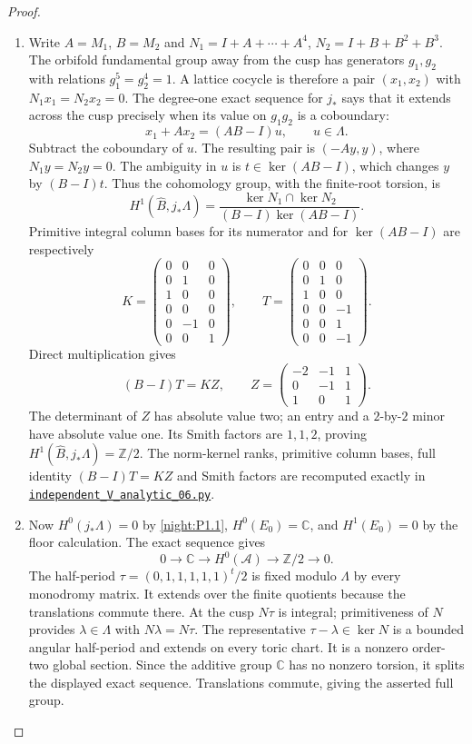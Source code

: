 \begin{proof}
\begin{enumerate}[label={$\langle1\rangle$\arabic*.}]
\item Write $A=M_1$, $B=M_2$ and
$N_1=I+A+\cdots+A^4$, $N_2=I+B+B^2+B^3$.
The orbifold fundamental group away from the cusp has generators
$g_1,g_2$ with relations $g_1^5=g_2^4=1$.  A lattice cocycle is
therefore a pair $(x_1,x_2)$ with $N_1x_1=N_2x_2=0$.
The degree-one exact sequence for $j_*$ says that it extends across
the cusp precisely when its value on $g_1g_2$ is a coboundary:
\[
x_1+Ax_2=(AB-I)u,\qquad u\in\Lambda.
\]
Subtract the coboundary of $u$.  The resulting pair is $(-Ay,y)$,
where $N_1y=N_2y=0$.  The ambiguity in $u$ is
$t\in\ker(AB-I)$, which changes $y$ by $(B-I)t$.
Thus the cohomology group, with the finite-root torsion, is
\[
H^1(\widehat B,j_*\Lambda)=
\frac{\ker N_1\cap\ker N_2}{(B-I)\ker(AB-I)}.
\]
Primitive integral column bases for its numerator and for
$\ker(AB-I)$ are respectively
\[
K=\begin{pmatrix}
0&0&0\\0&1&0\\1&0&0\\0&0&0\\0&-1&0\\0&0&1
\end{pmatrix},\qquad
T=\begin{pmatrix}
0&0&0\\0&1&0\\1&0&0\\0&0&-1\\0&0&1\\0&0&-1
\end{pmatrix}.
\]
Direct multiplication gives
\[
(B-I)T=KZ,\qquad
Z=\begin{pmatrix}-2&-1&1\\0&-1&1\\1&0&1\end{pmatrix}.
\]
The determinant of $Z$ has absolute value two; an entry and a
$2$-by-$2$ minor have absolute value one.  Its Smith factors are
$1,1,2$, proving $H^1(\widehat B,j_*\Lambda)=\mathbb Z/2$.
The norm-kernel ranks, primitive column bases, full identity
$(B-I)T=KZ$ and Smith factors are recomputed exactly in
\href{https://github.com/KokunoYumeto/s6-complex-structure-workbench/blob/83d76022bcd442278b760db9ff438afceed6c6ea/pro_returns/S6_SERIES_GRIND_checkpoint_10_20261120T0211Z/code/current_audits/audit_corrections/code/independent_V_analytic_06.py}{\texttt{independent\_V\_analytic\_06.py}}.
\item Now $H^0(j_*\Lambda)=0$ by \cref{night:P1.1},
$H^0(E_0)=\mathbb C$, and $H^1(E_0)=0$ by the floor
calculation. The exact sequence gives
\[
0\to\mathbb C\to H^0(\mathcal A)\to\mathbb Z/2\to0.
\]
The half-period
$\tau=(0,1,1,1,1,1)^t/2$ is fixed modulo $\Lambda$
by every monodromy matrix. It extends over the finite
quotients because the translations commute there.
At the cusp $N\tau$ is integral; primitiveness of $N$
provides $\lambda\in\Lambda$ with $N\lambda=N\tau$.
The representative $\tau-\lambda\in\ker N$ is a bounded
angular half-period and extends on every toric chart.
It is a nonzero order-two global section. Since the
additive group $\mathbb C$ has no nonzero torsion, it
splits the displayed exact sequence. Translations
commute, giving the asserted full group.


\end{enumerate}
\end{proof}
